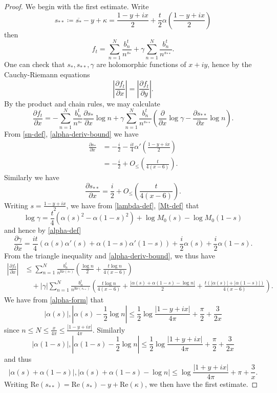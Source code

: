 \documentclass[a4paper,11pt,twoside]{amsart}
\begin{document}
\begin{proof}
We begin with the first estimate.  Write 
$$ s_{**} \coloneqq \overline{s_*} - y + \kappa = \frac{1-y+ix}{2} + \frac{t}{2} \alpha\left(\frac{1-y+ix}{2}\right)$$
then
\begin{equation}\label{ftne}
f_t = \sum_{n=1}^N \frac{b_n^t}{n^{s_*}} + \gamma \sum_{n=1}^N \frac{b_n^t}{n^{s_{**}}}.
\end{equation}
One can check that $s_*, s_{**}, \gamma$ are holomorphic functions of $x+iy$, hence by the Cauchy-Riemann equations
$$ \left|\frac{\partial f_t}{\partial x}\right| = \left|\frac{\partial f_t}{\partial y}\right|.$$
By the product and chain rules, we may calculate
$$ 
\frac{\partial f_t}{\partial x} = - \sum_{n=1}^N \frac{b_n^t}{n^{s_*}} \frac{\partial s_*}{\partial x} \log n + \gamma \sum_{n=1}^N \frac{b_n^t}{n^{s_{**}}}
\left( \frac{\partial}{\partial x} \log \gamma - \frac{\partial s_{**}}{\partial x} \log n\right).$$
From \eqref{sn-def}, \eqref{alpha-deriv-bound} we have
\begin{align*}
 \frac{\partial s_*}{\partial x} &= -\frac{i}{2} - \frac{it}{4} \alpha'\left(\frac{1-y+ix}{2}\right) \\
&= -\frac{i}{2} + O_{\leq}\left( \frac{t}{4(x-6)} \right).
\end{align*}
Similarly we have
$$ \frac{\partial s_{**}}{\partial x} = \frac{i}{2} + O_{\leq}\left( \frac{t}{4(x-6)} \right).$$
Writing $s = \frac{1-y+ix}{2}$, we have from \eqref{lambda-def}, \eqref{Mt-def} that
$$ \log \gamma = \frac{t}{4} (\alpha(s)^2 - \alpha(1-s)^2) + \log M_0(s) - \log M_0(1-s) $$
and hence by \eqref{alpha-def}
$$ \frac{\partial \gamma}{\partial x} = \frac{it}{4} (\alpha(s) \alpha'(s) + \alpha(1-s) \alpha'(1-s))
+ \frac{i}{2} \alpha(s) + \frac{i}{2} \alpha(1-s).$$
From the triangle inequality and \eqref{alpha-deriv-bound}, we thus have
\begin{align*}
|\frac{\partial f_t}{\partial x}| &\leq \sum_{n=1}^N \frac{b_n^t}{n^{\mathrm{Re}(s_*)}} \left(\frac{\log n}{2} + \frac{t \log n}{4(x-6)}\right) \\
&\quad + |\gamma| \sum_{n=1}^N \frac{b_n^t}{n^{\mathrm{Re}(s_{**})}}
\left( \frac{t \log n}{4(x-6)} + \frac{|\alpha(s) + \alpha(1-s) - \log n|}{2} + \frac{t (|\alpha(s)| + |\alpha(1-s)|)}{4(x-6)}\right).
\end{align*}
We have from \eqref{alpha-form} that
$$ |\alpha(s)|, |\alpha(s) - \frac{1}{2} \log n| \leq \frac{1}{2} \log \frac{|1-y+ix|}{4\pi} + \frac{\pi}{2} + \frac{3}{2x} $$
since $n \leq N \leq \frac{x}{4\pi} \leq \frac{|1-y+ix|}{4\pi}$.  Similarly
$$ |\alpha(1-s)|, |\alpha(1-s) - \frac{1}{2} \log n| \leq \frac{1}{2} \log \frac{|1+y+ix|}{4\pi} + \frac{\pi}{2} + \frac{3}{2x} $$
and thus
$$ |\alpha(s)+\alpha(1-s)|, |\alpha(s)+\alpha(1-s)-\log n| \leq \log \frac{|1+y+ix|}{4\pi} + \pi + \frac{3}{x}.$$
Writing $\mathrm{Re}(s_{**}) = \mathrm{Re}(s_*) - y + \mathrm{Re}(\kappa)$, we then have the first estimate.


\end{proof}
\end{document}
